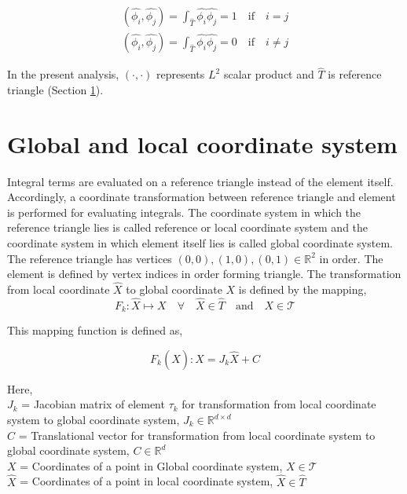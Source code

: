 \documentclass[a4paper,openany]{book}
\begin{document}
\begin{equation}
\begin{split}
(\hat{\phi_i } , \hat{\phi_j}) = \int_{\hat{T}} \hat{\phi_i} \hat{\phi_j} = 1 \quad \textrm{if} \quad i = j \\
(\hat{\phi_i } , \hat{\phi_j}) = \int_{\hat{T}} \hat{\phi_i} \hat{\phi_j} = 0 \quad \textrm{if} \quad i \neq j 
\end{split}
\end{equation}

In the present analysis, $(\cdot,\cdot)$ represents $L^2$ scalar product and $\hat{T}$ is reference triangle (Section \ref{section_glob_loc}). 

\section{Global and local coordinate system} \label{section_glob_loc}

Integral terms are evaluated on a reference triangle instead of the element itself. Accordingly, a coordinate transformation between reference triangle and element is performed for evaluating integrals. The coordinate system in which the reference triangle lies is called reference or local coordinate system and the coordinate system in which element itself lies is called global coordinate system. The reference triangle has vertices $(0,0),(1,0),(0,1) \in \mathbb{R}^2$ in order. The element is defined by vertex indices in order forming triangle. The transformation from local coordinate $\hat{X}$ to global coordinate $X$ is defined by the mapping,
\begin{equation}\label{local global mapping}
F_k:\hat{X} \mapsto X \quad \forall \quad \hat{X} \in \hat{T} \quad \textrm{and} \quad X \in \mathcal{T}
\end{equation}

This mapping function is defined as,

\begin{equation}\label{local global mapping equation}
F_k(\hat{X}): X = J_k \hat{X} + C
\end{equation}

Here,
\\
$J_k$ = Jacobian matrix of element $\tau_k$ for transformation from local coordinate system to global coordinate system, $J_k \in \mathbb{R}^{d \times d}$\\
$C$ = Translational vector for transformation from local coordinate system to global coordinate system, $C \in \mathbb{R}^d$\\
$X$ = Coordinates of a point in Global coordinate system, $X \in \mathcal{T}$ \\
$\hat{X}$ = Coordinates of a point in local coordinate system, $\hat{X} \in \hat{T}$\\
\end{document}
